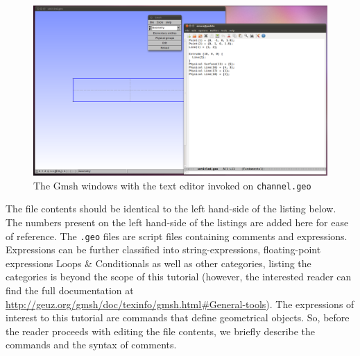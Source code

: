 \begin{figure}[htbp]
 \centering
  \includegraphics[width=1.0\textwidth]{../figures/shot15}
  \caption{The Gmsh windows with the text editor invoked on \lstinline{channel.geo}}
  \label{fig:shot15}
\end{figure}
\par
The file contents should be identical to the left hand-side of the listing below. The numbers present
on the left hand-side of the listings are added here for ease of reference. The \lstinline{.geo} files
are script files containing comments and expressions. Expressions can be further classified into 
string-expressions, floating-point expressions Loops \& Conditionals as well as other categories,
listing the categories is beyond the scope of this tutorial (however, the interested reader can find
the full documentation at \url{http://geuz.org/gmsh/doc/texinfo/gmsh.html#General-tools}). The expressions
of interest to this tutorial are commands that define geometrical objects. So, before the reader proceeds
with editing the file contents, we briefly describe the commands and the syntax of comments.
